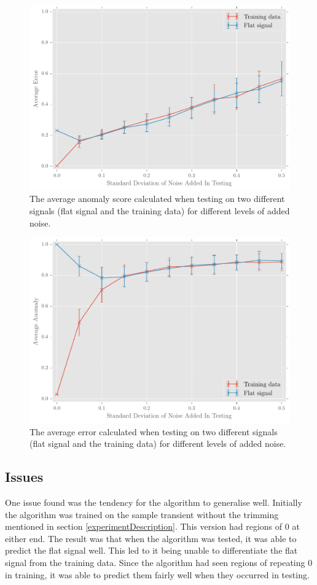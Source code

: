 \documentclass[a4paper]{jpconf}
\begin{document}
		\begin{figure}
			\centering
			\includegraphics[width=\textwidth]{averageErrorPlot.pdf}
			\caption{\label{fig:averageError}The average anomaly score calculated when testing on two different signals (flat signal and the training data) for different levels of added noise.}
		\end{figure}
		\begin{figure}
			\centering
			\includegraphics[width=\textwidth]{averageAnomalyPlot.pdf}
			\caption{\label{fig:averageAnomaly}The average error calculated when testing on two different signals (flat signal and the training data) for different levels of added noise.}
		\end{figure}
		
	\subsection{Issues}
		One issue found was the tendency for the algorithm to generalise well. Initially the algorithm was trained on the sample transient without the trimming mentioned in section \ref{experimentDescription}. This version had regions of 0 at either end. The result was that when the algorithm was tested, it was able to predict the flat signal well. This led to it being unable to differentiate the flat signal from the training data. Since the algorithm had seen regions of repeating 0 in training, it was able to predict them fairly well when they occurred in testing.
		
\end{document}
